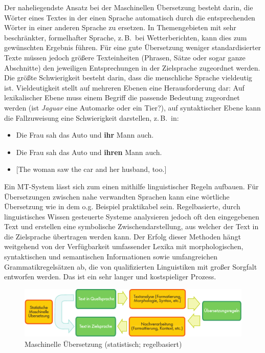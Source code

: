 \documentclass[]{../../metanetpaper}
\begin{document}
\begin{multicols}{2}

Der naheliegendste Ansatz bei der Maschinellen Übersetzung besteht darin, die Wörter eines Textes in der einen Sprache automatisch durch die entsprechenden Wörter in einer anderen Sprache zu ersetzen. In Themengebieten mit sehr beschränkter, formelhafter Sprache, z.\,B.~bei Wetterberichten, kann dies zum gewünschten Ergebnis führen. Für eine gute Übersetzung weniger standardisierter Texte müssen jedoch größere Texteinheiten (Phrasen, Sätze oder sogar ganze Abschnitte) den jeweiligen Entsprechungen in der Zielsprache zugeordnet werden. Die größte Schwierigkeit besteht darin, dass die menschliche Sprache vieldeutig ist. Vieldeutigkeit stellt auf mehreren Ebenen eine Herausforderung dar: Auf lexikalischer Ebene muss einem Begriff die passende Bedeutung zugeordnet werden (ist \textit{Jaguar} eine Automarke oder ein Tier?), auf syntaktischer Ebene kann die Fallzuweisung eine Schwierigkeit darstellen, z.\,B.~in:

\begin{itemize}
\item Die Frau sah das Auto und \textbf{ihr} Mann auch. 
\item Die Frau sah das Auto und \textbf{ihren} Mann auch.
\item {[}The woman saw the car and her husband, too.{]}
\end{itemize}

Ein MT-System lässt sich zum einen mithilfe linguistischer Regeln aufbauen. Für Übersetzungen zwischen nahe verwandten Sprachen kann eine wörtliche Übersetzung wie in dem o.g. Beispiel praktikabel sein. Regelbasierte, durch linguistisches Wissen gesteuerte Systeme analysieren jedoch oft den eingegebenen Text und erstellen eine symbolische Zwischendarstellung, aus welcher der Text in die Zielsprache übertragen werden kann. Der Erfolg dieser Methoden hängt weitgehend von der Verfügbarkeit umfassender Lexika mit morphologischen, syntaktischen und semantischen Informationen sowie umfangreichen Grammatikregelsätzen ab, die von qualifizierten Linguistiken mit großer Sorgfalt entworfen werden. Das ist ein sehr langer und kostspieliger Prozess.

\begin{figure}[htb]
  \vspace{-21mm}
  \center
  \includegraphics[width=\textwidth]{../_media/german/machine_translation}
  \vspace{-2mm}
  \caption{Maschinelle Übersetzung (statistisch; regelbasiert)}
  \label{fig:mtarch_de}
\end{figure}


\end{multicols}
\end{document}
